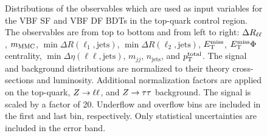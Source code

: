 \begin{figure}[htb]
\begin{subfigure}[t]{0.3\textwidth}
    \end{subfigure}
    \caption{Distributions of the observables which are used as input variables for the VBF SF and VBF DF BDTs in the top-quark control region.
             The observables are from top to bottom and from left to right: $\Delta R_{\ell\ell}$, $m_\text{MMC}$, $\min \Delta R (\ell_1, \text{jets})$, $\min \Delta R (\ell_2, \text{jets})$,
             $E_\text{T}^\text{miss}$, $E_\text{T}^\text{miss} \Phi$ centrality, $\min \Delta \eta (\ell\ell, \text{jets})$, $m_{jj}$, $n_\text{jets}$, and $p_\text{T}^\text{total}$.
             The signal and background distributions are normalized to their theory cross-sections and luminosity.
             Additional normalization factors are applied on the top-quark, $Z \to \ell \ell$, and $Z \to \tau \tau$ background.
             The signal is scaled by a factor of 20.
             Underflow and overflow bins are included in the first and last bin, respectively.
             Only statistical uncertainties are included in the error band.}\label{fig:mva:modeling:cr:vbftop}
\end{figure}

